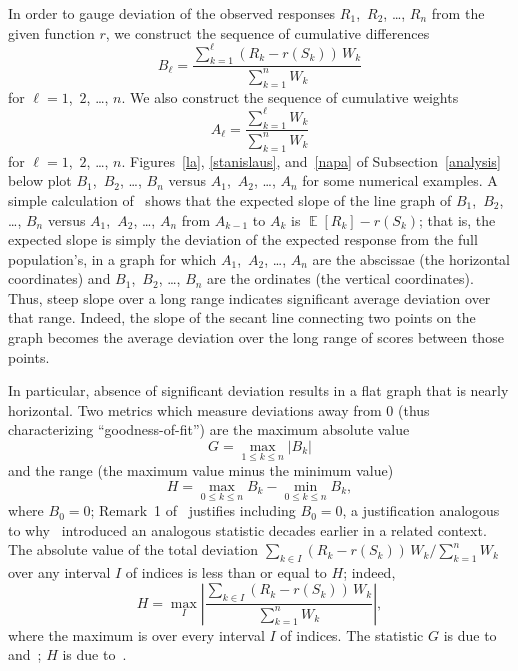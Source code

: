 \documentclass[12pt]{article}
\DeclareMathOperator{\E}{\mathop{}\mathbb{E}}
\begin{document}
In order to gauge deviation of the observed responses
$R_1$,~$R_2$, \dots, $R_n$ from the given function $r$,
we construct the sequence of cumulative differences
%
\begin{equation}
B_{\ell} = \frac{\sum_{k=1}^{\ell} (R_k - r(S_k)) \, W_k}{\sum_{k=1}^n W_k}
\end{equation}
%
for $\ell = 1$,~$2$, \dots, $n$.
We also construct the sequence of cumulative weights
%
\begin{equation}
A_{\ell} = \frac{\sum_{k=1}^{\ell} W_k}{\sum_{k=1}^n W_k}
\end{equation}
%
for $\ell = 1$,~$2$, \dots, $n$.
Figures~\ref{la}, \ref{stanislaus}, and~\ref{napa}
of Subsection~\ref{analysis} below plot $B_1$,~$B_2$, \dots, $B_n$
versus $A_1$,~$A_2$, \dots, $A_n$ for some numerical examples.
A simple calculation of~\citet{tygert_full} shows that the expected slope
of the line graph of $B_1$,~$B_2$, \dots, $B_n$ versus 
$A_1$,~$A_2$, \dots, $A_n$ from $A_{k-1}$ to $A_k$ is $\E[R_k] - r(S_k)$;
that is, the expected slope is simply the deviation of the expected response
from the full population's, in a graph for which $A_1$,~$A_2$, \dots, $A_n$
are the abscissae (the horizontal coordinates) and $B_1$,~$B_2$, \dots, $B_n$
are the ordinates (the vertical coordinates).
Thus, steep slope over a long range indicates
significant average deviation over that range.
Indeed, the slope of the secant line connecting two points on the graph becomes
the average deviation over the long range of scores between those points.

In particular, absence of significant deviation results
in a flat graph that is nearly horizontal.
Two metrics which measure deviations away from 0
(thus characterizing ``goodness-of-fit'') are the maximum absolute value
%
\begin{equation}
\label{kolmogorov-smirnov}
G = \max_{1 \le k \le n} |B_k|
\end{equation}
%
and the range (the maximum value minus the minimum value)
%
\begin{equation}
\label{kuiper}
H = \max_{0 \le k \le n} B_k - \min_{0 \le k \le n} B_k,
\end{equation}
%
where $B_0 = 0$; Remark~1 of~\citet{tygert_full} justifies including $B_0 = 0$,
a justification analogous to why~\citet{kuiper} introduced
an analogous statistic decades earlier in a related context.
The absolute value of the total deviation
$\sum_{k \in I} (R_k - r(S_k)) \, W_k \Big/ \sum_{k=1}^n W_k$
over any interval $I$ of indices is less than or equal to $H$; indeed,
%
\begin{equation}
H = \max_I \left| \frac{\sum_{k \in I} (R_k - r(S_k)) \, W_k}
                       {\sum_{k=1}^n W_k} \right|,
\end{equation}
%
where the maximum is over every interval $I$ of indices.
The statistic $G$ is due to~\citet{kolmogorov} and~\citet{smirnov};
$H$ is due to~\citet{kuiper}.
\end{document}
